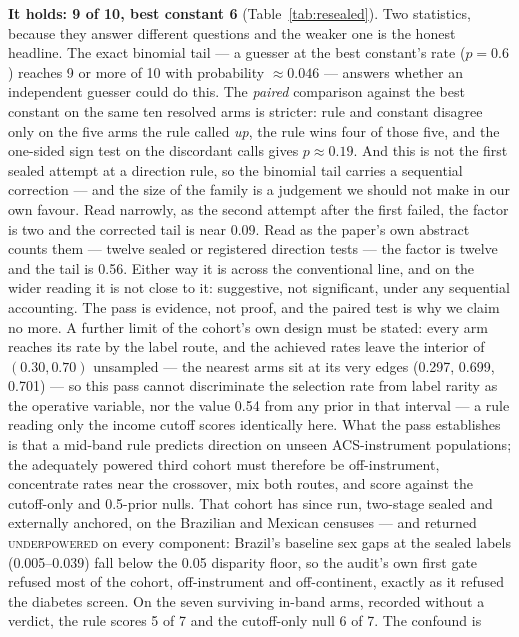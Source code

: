 \documentclass[conference]{IEEEtran}
\begin{document}
\textbf{It holds: 9 of 10, best constant 6} (Table~\ref{tab:resealed}). Two statistics,
because they answer different questions and the weaker one is the honest headline. The
exact binomial tail --- a guesser at the best constant's rate ($p = 0.6$) reaches 9 or
more of 10 with probability $\approx 0.046$ --- answers whether an independent guesser
could do this. The \emph{paired} comparison against the best constant on the same ten
resolved arms is stricter: rule and constant disagree only on the five arms the rule
called \emph{up}, the rule wins four of those five, and the one-sided sign test on the
discordant calls gives $p \approx 0.19$. And this is not the first sealed attempt at a direction rule, so the binomial tail carries a
sequential correction --- and the size of the family is a judgement we should not make in our
own favour. Read narrowly, as the second attempt after the first failed, the factor is two and
the corrected tail is near 0.09. Read as the paper's own abstract counts them --- twelve sealed or registered direction tests --- the factor is twelve and the tail is 0.56. Either way it is
across the conventional line, and on the wider reading it is not close to it: suggestive, not
significant, under any sequential accounting. The
pass is evidence, not proof, and the paired test is why we claim no more. A further limit of
the cohort's own design must be stated: every arm reaches its rate by the label route, and
the achieved rates leave the interior of $(0.30, 0.70)$ unsampled --- the nearest arms
sit at its very edges (0.297, 0.699, 0.701) --- so this pass cannot discriminate the
selection rate from label rarity as the operative variable, nor the value 0.54 from any
prior in that interval --- a rule reading only the income cutoff scores identically here.
What the pass establishes is that a mid-band rule predicts direction on unseen
ACS-instrument populations; the adequately powered third cohort must therefore be
off-instrument, concentrate rates near the crossover, mix both routes, and score against
the cutoff-only and 0.5-prior nulls. That cohort has since run, two-stage sealed and
externally anchored, on the Brazilian and Mexican censuses --- and returned
\textsc{underpowered} on every component: Brazil's baseline sex gaps at the sealed
labels (0.005--0.039) fall below the 0.05 disparity floor, so the audit's own first
gate refused most of the cohort, off-instrument and off-continent, exactly as it
refused the diabetes screen. On the seven surviving in-band arms, recorded without a
verdict, the rule scores 5 of 7 and the cutoff-only null 6 of 7. The confound is
\end{document}
